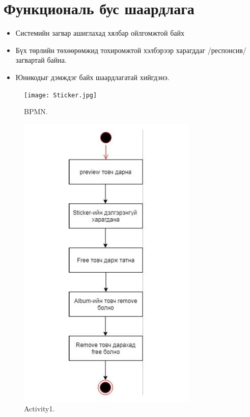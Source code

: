 \documentclass[12pt]{article}
\begin{document}
	\section{Функциональ бус шаардлага}	
		\begin{itemize}
			\item Системийн загвар ашиглахад хялбар ойлгомжтой байх
			\item Бүх төрлийн төхөөрөмжид тохиромжтой хэлбэрээр харагддаг /респонсив/ загвартай байна.
			\item  Юникодыг дэмждэг байх шаардлагатай хийгдэнэ.		
		\end{itemize}
		\begin{figure}
			\texttt{[image: Sticker.jpg]}
			\caption{BPMN.}
			\label{fig:bpmn1}
		\end{figure}
		\begin{figure}
		\includegraphics[width=\linewidth]{activity.jpg}
		\caption{Activity1.}
		\label{fig:activity1}
		\end{figure}
\end{document}
